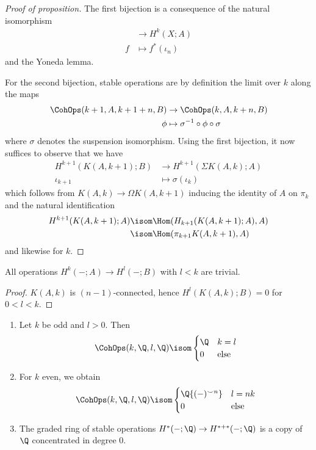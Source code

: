 \begin{proof}[Proof of proposition]
	The first bijection is a consequence of the natural isomorphism
	\begin{align*}
		[X, K(A, k)] &\to H^k(X; A) \\
		f &\mapsto f^*(\iota_n)
	\end{align*}
	and the Yoneda lemma.

	For the second bijection, stable operations are by definition the limit over $k$ along the maps
	\begin{align*}
		\CohOps(k + 1, A, k + 1 + n, B) &\to \CohOps(k, A, k + n, B) \\
		\phi &\mapsto \sigma^{-1} \circ \phi \circ \sigma
	\end{align*}
	where $\sigma$ denotes the suspension isomorphism.
	Using the first bijection, it now suffices to observe that we have
	\begin{align*}
		H^{k + 1}(K(A, k + 1); B) &\to H^{k + 1}(\Sigma K(A, k); A) \\
		\iota_{k + 1} &\mapsto \sigma(\iota_k)
	\end{align*}
	which follows from $K(A, k) \to \Omega K(A, k + 1)$ inducing the identity of $A$ on $\pi_k$ and the natural identification
	\begin{align*}
		H^{k + 1}(K(A, k + 1); A) &\isom \Hom(H_{k + 1}(K(A, k + 1); A), A) \\ 
								  &\isom \Hom(\pi_{k + 1} K(A, k + 1), A)
	\end{align*}
	and likewise for $k$.
\end{proof}
\begin{corollary}
	All operations $H^k({{-}}; A) \to H^l({{-}}; B)$ with $l < k$ are trivial.
\end{corollary}
\begin{proof}
	$K(A, k)$ is $(n - 1)$-connected, hence $H^l(K(A, k); B) = 0$ for $0 < l < k$.
\end{proof}
\begin{corollary}
	\leavevmode
	\begin{enumerate}
		\item Let $k$ be odd and $l > 0$.
			Then
			\begin{equation*}
				\CohOps(k, \Q, l, \Q) \isom \begin{cases}
					\Q 	& k = l \\
					0 	& \text{else}
				\end{cases}
			\end{equation*}
		\item For $k$ even, we obtain
			\begin{equation*}
				\CohOps(k, \Q, l, \Q) \isom \begin{cases}
					\Q\{({{-}})^{\smile n}\} 	& l = n k \\
					0 							& \text{else}
				\end{cases}
			\end{equation*}
		\item The graded ring of stable operations $H^*({{-}}; \Q) \to H^{* + *}({{-}}; \Q)$ is a copy of $\Q$ concentrated in degree 0.
	\end{enumerate}
\end{corollary}
